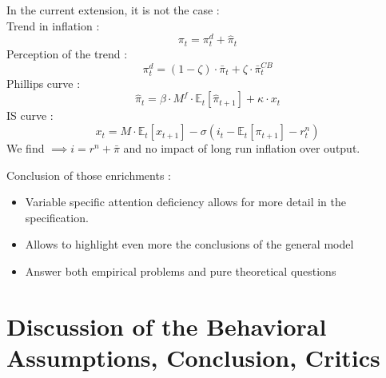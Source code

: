 \documentclass{beamer}
\newcommand\ReduceFont{\fontsize{10}{7.2}\selectfont}
\begin{document}
\begin{frame}{\subsecname}
    In the current extension, it is not the case : \\
    Trend in inflation :
    \begin{equation*}
        {\pi}_{t}=\pi^{d}_{t}+\hat{\pi}_{t}
    \end{equation*}
    Perception of the trend :
    \begin{equation}\tag{59}
        \pi^{d}_{t}=(1-\zeta)\cdot\bar{\pi}_{t}+\zeta\cdot\bar{\pi}_{t}^{CB}
    \end{equation}
    Phillips curve :
    \begin{equation}\tag{61}
        \hat{\pi}_{t}=\beta\cdot M^{f}\cdot\mathbb{E}_t\left[\hat{\pi}_{t+1}\right]+\kappa\cdot x_{t}
    \end{equation}
    IS curve :
    \begin{equation}\tag{60}
        x_{t}=M\cdot\mathbb{E}_{t}\left[x_{t+1}\right]-\sigma\left(i_{t}-\mathbb{E}_{t}\left[\pi_{t+1}\right]-r^{n}_{t}\right)
    \end{equation}
    We find $\implies i=r^{n}+\bar{\pi}$ and no impact of long run inflation over output.
\end{frame}

\begin{frame}
    Conclusion of those enrichments :
    \begin{itemize}
        \item Variable specific attention deficiency allows for more detail in the specification.
        \item Allows to highlight even more the conclusions of the general model
        \item Answer both empirical problems and pure theoretical questions
    \end{itemize}
\end{frame}


\section{Discussion of the Behavioral Assumptions, Conclusion, Critics}
\begin{frame}
    \ReduceFont
\end{frame}

\begin{frame}
    \tableofcontents[currentsection, hideothersubsections, sections=\value{section}]
\end{frame}
\end{document}
